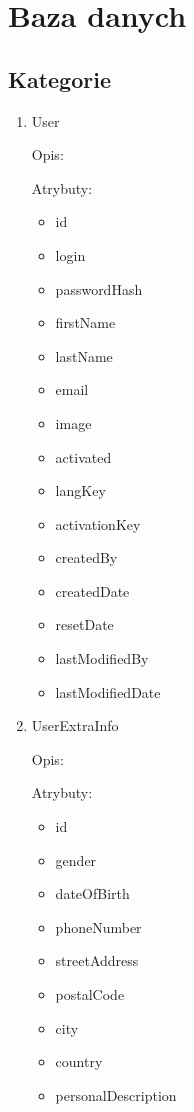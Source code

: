 \section{Baza danych}

\subsection{Kategorie}

\begin{enumerate}[label={\textbf{KAT/\protect\threedigits{\theenumi}}}, wide, labelwidth=!, labelindent=0pt]
    \setlength\itemsep{1em}
    \item \label{kat:user} User

    Opis: \lipsum[1]
    \par
    Atrybuty:
    \begin{itemize}
        \item id
        \item login
        \item passwordHash
        \item firstName
        \item lastName
        \item email
        \item image
        \item activated
        \item langKey
        \item activationKey
        \item createdBy
        \item createdDate
        \item resetDate
        \item lastModifiedBy
        \item lastModifiedDate
    \end{itemize}

    \item \label{kat:UserExtraInfo} UserExtraInfo

    Opis: \lipsum[1]
    \par
    Atrybuty:
    \begin{itemize}
        \item id
        \item gender
        \item dateOfBirth
        \item phoneNumber
        \item streetAddress
        \item postalCode
        \item city
        \item country
        \item personalDescription
    \end{itemize}


\end{enumerate}
